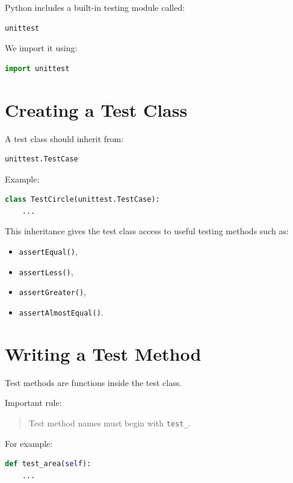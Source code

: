 \documentclass[11pt]{article}
\begin{document}
Python includes a built-in testing module called:

\begin{lstlisting}[language=Python]
unittest
\end{lstlisting}

We import it using:

\begin{lstlisting}[language=Python]
import unittest
\end{lstlisting}

\section{Creating a Test Class}

A test class should inherit from:

\begin{lstlisting}[language=Python]
unittest.TestCase
\end{lstlisting}

Example:

\begin{lstlisting}[language=Python]
class TestCircle(unittest.TestCase):
    ...
\end{lstlisting}

This inheritance gives the test class access to useful testing methods such as:

\begin{itemize}
    \item \texttt{assertEqual()},
    \item \texttt{assertLess()},
    \item \texttt{assertGreater()},
    \item \texttt{assertAlmostEqual()}.
\end{itemize}

\section{Writing a Test Method}

Test methods are functions inside the test class.

Important rule:

\begin{quote}
Test method names must begin with \texttt{test\_}.
\end{quote}

For example:

\begin{lstlisting}[language=Python]
def test_area(self):
    ...
\end{lstlisting}
\end{document}

